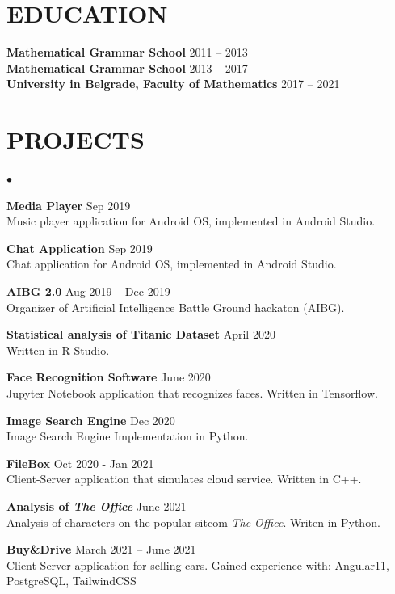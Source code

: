 \documentclass[margin,center]{res}
\newenvironment{list2}{
  \begin{list}{$\bullet$}{%
      \setlength{\itemsep}{0in}
      \setlength{\parsep}{0in} \setlength{\parskip}{0in}
      \setlength{\topsep}{0in} \setlength{\partopsep}{0in}
      \setlength{\leftmargin}{0.2in}}}{\end{list}}
\begin{document}
\begin{resume}
\section{EDUCATION}
{\bf Mathematical Grammar School} \hfill 2011 -- 2013\\
{\bf Mathematical Grammar School} \hfill 2013 -- 2017\\
{\bf University in Belgrade, Faculty of Mathematics}  \hfill 2017 -- 2021


\section{PROJECTS\\}
\begin{list2}
  \item{\bf Media Player} \hfill  Sep 2019\\
    Music player application for Android OS, implemented in Android Studio.
  \item{\bf Chat Application} \hfill Sep 2019\\
    Chat application for Android OS, implemented in Android Studio.
  \item{\bf AIBG 2.0} \hfill Aug 2019 -- Dec 2019 \\ 
    Organizer of Artificial Intelligence Battle Ground hackaton (AIBG).
  \item{\bf Statistical analysis of Titanic Dataset} \hfill April 2020\\
    Written in R Studio.  
  \item{\bf Face Recognition Software} \hfill June 2020\\
    Jupyter Notebook application that recognizes faces. Written in Tensorflow.
  \item{\bf Image Search Engine} \hfill Dec 2020 \\
    Image Search Engine Implementation in Python.
  \item{\bf FileBox}  \hfill Oct 2020 - Jan 2021\\
    Client-Server application that simulates cloud service. Written in C++.
  \item{\bf Analysis of \emph{The Office}} \hfill June 2021 \\
    Analysis of characters on the popular sitcom \emph{The Office}. Writen in Python.
  \item{\bf Buy\&Drive} \hfill March 2021 -- June 2021 \\
    Client-Server application for selling cars. Gained experience with: Angular11, PostgreSQL, TailwindCSS


\end{list2}
\end{resume}
\end{document}
